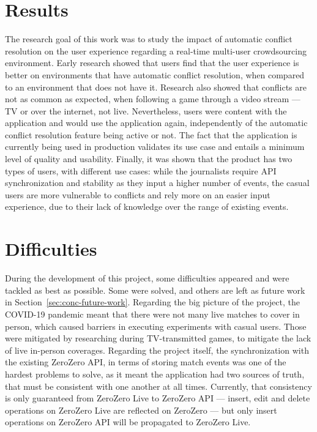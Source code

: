 \section{Results} \label{sec:conc-results}
The research goal of this work was to study the impact of automatic conflict resolution on the user experience regarding a real-time multi-user crowdsourcing environment. Early research showed that users find that the user experience is better on environments that have automatic conflict resolution, when compared to an environment that does not have it. Research also showed that conflicts are not as common as expected, when following a game through a video stream --- TV or over the internet, not live. Nevertheless, users were content with the application and would use the application again, independently of the automatic conflict resolution feature being active or not. The fact that the application is currently being used in production validates its use case and entails a minimum level of quality and usability. Finally, it was shown that the product has two types of users, with different use cases: while the journalists require API synchronization and stability as they input a higher number of events, the casual users are more vulnerable to conflicts and rely more on an easier input experience, due to their lack of knowledge over the range of existing events.

\section{Difficulties} \label{sec:difficulties}
During the development of this project, some difficulties appeared and were tackled as best as possible. Some were solved, and others are left as future work in Section~\ref{sec:conc-future-work}. Regarding the big picture of the project, the COVID-19 pandemic meant that there were not many live matches to cover in person, which caused barriers in executing experiments with casual users. Those were mitigated by researching during TV-transmitted games, to mitigate the lack of live in-person coverages. Regarding the project itself, the synchronization with the existing ZeroZero API, in terms of storing match events was one of the hardest problems to solve, as it meant the application had two sources of truth, that must be consistent with one another at all times. Currently, that consistency is only guaranteed from ZeroZero Live to ZeroZero API --- insert, edit and delete operations on ZeroZero Live are reflected on ZeroZero --- but only insert operations on ZeroZero API will be propagated to ZeroZero Live.

